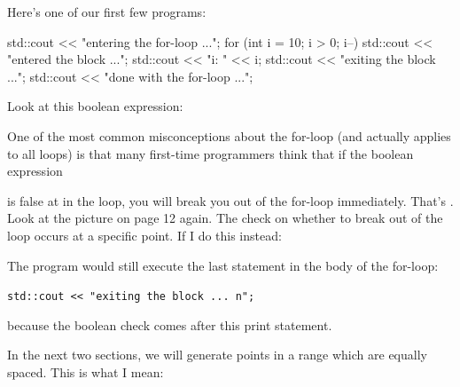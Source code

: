 \newpage{}

Here's one of our first few programs:
\begin{console}
std::cout << "entering the for-loop ...\n";
for (int i = 10; i > 0; i--)
{   
    std::cout << "entered the block ...\n";
    std::cout << "i: " << i;
    std::cout << "exiting the block ...\n";
}
std::cout << "done with the for-loop ...\n";
\end{console}

Look at this boolean expression:
One of the most common misconceptions about the for-loop (and actually
applies to all loops) is that many first-time programmers think that if
the boolean expression
\begin{center}
\end{center}
is false at  in the loop, you will break you out of
the for-loop immediately. That's . Look
at the picture on page 12 again. The check on whether to break out of
the loop occurs at a specific point. If I do this instead:


The program would still execute the last statement in the body of the
for-loop:
\begin{center}
\texttt{std::cout << "exiting the block ...\ n";}
\end{center}
because the boolean check comes after this print statement.
\begin{center}
\end{center}

\newpage{}

In the next two sections, we will generate points in a range which are
equally spaced. This is what I mean:

